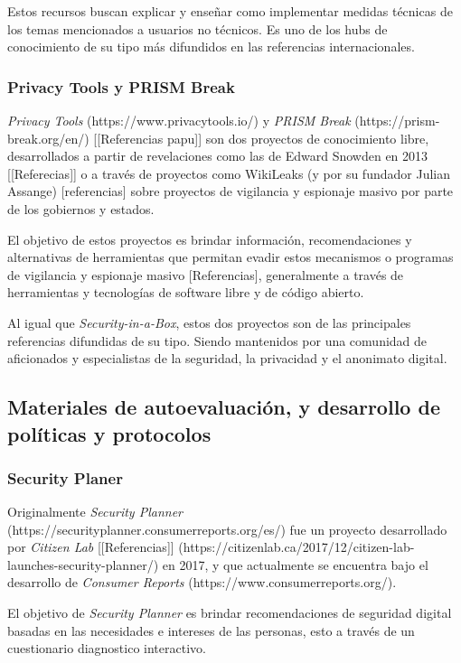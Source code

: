 \documentclass[12pt]{caltech_thesis}
\begin{document}
Estos recursos buscan explicar y enseñar como implementar medidas técnicas de los temas mencionados a usuarios no técnicos. Es uno de los hubs de conocimiento de su tipo más difundidos en las referencias internacionales.

\subsubsection{Privacy Tools y PRISM Break}

\textit{Privacy Tools} (https://www.privacytools.io/) y \textit{PRISM Break} (https://prism-break.org/en/) [[Referencias papu]] son dos proyectos de conocimiento libre, desarrollados a partir de revelaciones como las de Edward Snowden en 2013 [[Referecias]] o a través de proyectos como WikiLeaks (y por su fundador Julian Assange) [referencias] sobre proyectos de vigilancia y espionaje masivo por parte de los gobiernos y estados.

El objetivo de estos proyectos es brindar información, recomendaciones y alternativas de herramientas que permitan evadir estos mecanismos o programas de vigilancia y espionaje masivo [Referencias], generalmente a través de herramientas y tecnologías de software libre y de código abierto.

Al igual que \textit{Security-in-a-Box}, estos dos proyectos son de las principales referencias difundidas de su tipo. Siendo mantenidos por una comunidad de aficionados y especialistas de la seguridad, la privacidad y el anonimato digital.

\subsection{Materiales de autoevaluación, y desarrollo de políticas y protocolos}

\subsubsection{Security Planer}

Originalmente \textit{Security Planner} (https://securityplanner.consumerreports.org/es/) fue un proyecto desarrollado por \textit{Citizen Lab} [[Referencias]] (https://citizenlab.ca/2017/12/citizen-lab-launches-security-planner/) en 2017, y que actualmente se encuentra bajo el desarrollo de \textit{Consumer Reports} (https://www.consumerreports.org/).

El objetivo de \textit{Security Planner} es brindar recomendaciones de seguridad digital basadas en las necesidades e intereses de las personas, esto a través de un cuestionario diagnostico interactivo.
\end{document}
